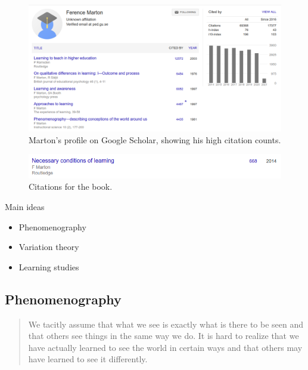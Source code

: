 \begin{frame}
  \begin{figure}
    \includegraphics[width=\columnwidth]{fig/marton-gscholar.png}
    \caption{Marton's profile on Google Scholar, showing his high citation 
    counts.}
  \end{figure}
\end{frame}

\begin{frame}
  \begin{figure}
    \includegraphics[width=\columnwidth]{fig/necessary-conditions-citations.png}
    \caption{Citations for the book.}
  \end{figure}
\end{frame}

\begin{frame}
  \begin{block}{Main ideas}
    \begin{itemize}
      \item Phenomenography~\cite{Phenomenography}
      \item Variation theory~\cite{VariationTheory}
      \item Learning studies~\cite{LearningStudy}
    \end{itemize}
  \end{block}
\end{frame}

\subsection{Phenomenography}

\begin{frame}
  \blockcquote{NecessaryConditionsOfLearning}{%
    We tacitly assume that what we see is exactly what is there to be seen and 
    that others see things in the same way we do. It is hard to realize that we 
    have actually learned to see the world in certain ways and that others may 
    have learned to see it differently.
  }
\end{frame}

